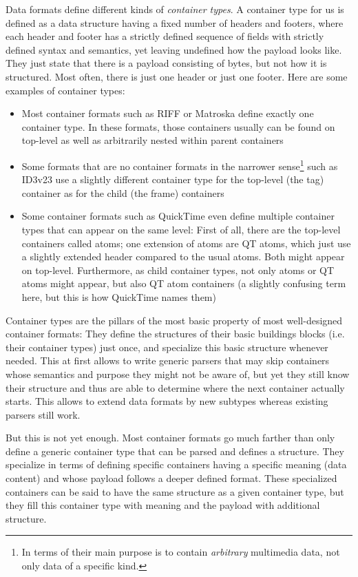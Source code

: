 Data formats define different kinds of \emph{container types}. A container type for us is defined as a data structure having a fixed number of headers and footers, where each header and footer has a strictly defined sequence of fields with strictly defined syntax and semantics, yet leaving undefined how the payload looks like. They just state that there is a payload consisting of bytes, but not how it is structured. Most often, there is just one header or just one footer. Here are some examples of container types:
\begin{itemize}
\item Most container formats such as RIFF or Matroska define exactly one container type. In these formats, those containers usually can be found on top-level as well as arbitrarily nested within parent containers   
\item Some formats that are no container formats in the narrower sense\footnote{In terms of their main purpose is to contain \emph{arbitrary} multimedia data, not only data of a specific kind.} such as ID3v23 use a slightly different container type for the top-level (the tag) container as for the child (the frame) containers 
\item Some container formats such as QuickTime even define multiple container types that can appear on the same level: First of all, there are the top-level containers called atoms; one extension of atoms are QT atoms, which just use a slightly extended header compared to the usual atoms. Both might appear on top-level. Furthermore, as child container types, not only atoms or QT atoms might appear, but also QT atom containers (a slightly confusing term here, but this is how QuickTime names them)
\end{itemize}

Container types are the pillars of the most basic property of most well-designed container formats: They define the structures of their basic buildings blocks (i.e. their container types) just once, and specialize this basic structure whenever needed. This at first allows to write generic parsers that may skip containers whose semantics and purpose they might not be aware of, but yet they still know their structure and thus are able to determine where the next container actually starts. This allows to extend data formats by new subtypes whereas existing parsers still work.

But this is not yet enough. Most container formats go much farther than only define a generic container type that can be parsed and defines a structure. They specialize in terms of defining specific containers having a specific meaning (data content) and whose payload follows a deeper defined format. These specialized containers can be said to have the same structure as a given container type, but they fill this container type with meaning and the payload with additional structure.

